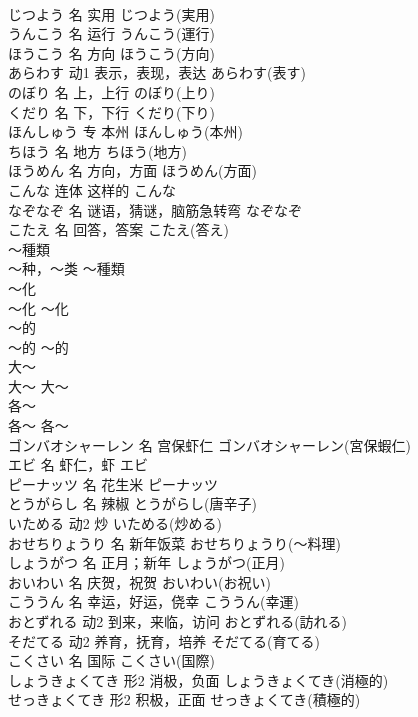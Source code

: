 \documentclass[8pt]{extreport}
\begin{document}
\begin{CJK}{UTF8}{min}
\\	じつよう	名	实用	じつよう(実用)	
\\	うんこう	名	运行	うんこう(運行)	
\\	ほうこう	名	方向	ほうこう(方向)	
\\	あらわす	动1	表示，表现，表达	あらわす(表す)	
\\	のぼり	名	上，上行	のぼり(上り)	
\\	くだり	名	下，下行	くだり(下り)	
\\	ほんしゅう	专	本州	ほんしゅう(本州)	
\\	ちほう	名	地方	ちほう(地方)	
\\	ほうめん	名	方向，方面	ほうめん(方面)	
\\	こんな	连体	这样的	こんな	
\\	なぞなぞ	名	谜语，猜谜，脑筋急转弯	なぞなぞ	
\\	こたえ	名	回答，答案	こたえ(答え)	
\\	～種類	
\\	～种，～类	～種類	
\\	～化	
\\	～化	～化	
\\	～的	
\\	～的	～的	
\\	大～	
\\	大～	大～	
\\	各～	
\\	各～	各～	
\\	ゴンバオシャーレン	名	宫保虾仁	ゴンバオシャーレン(宮保蝦仁)	
\\	エビ	名	虾仁，虾	エビ	
\\	ピーナッツ	名	花生米	ピーナッツ	
\\	とうがらし	名	辣椒	とうがらし(唐辛子)	
\\	いためる	动2	炒	いためる(炒める)	
\\	おせちりょうり	名	新年饭菜	おせちりょうり(～料理)	
\\	しょうがつ	名	正月；新年	しょうがつ(正月)	
\\	おいわい	名	庆贺，祝贺	おいわい(お祝い)	
\\	こううん	名	幸运，好运，侥幸	こううん(幸運)	
\\	おとずれる	动2	到来，来临，访问	おとずれる(訪れる)	
\\	そだてる	动2	养育，抚育，培养	そだてる(育てる)	
\\	こくさい	名	国际	こくさい(国際)	
\\	しょうきょくてき	形2	消极，负面	しょうきょくてき(消極的)	
\\	せっきょくてき	形2	积极，正面	せっきょくてき(積極的)	

\end{CJK}
\end{document}
